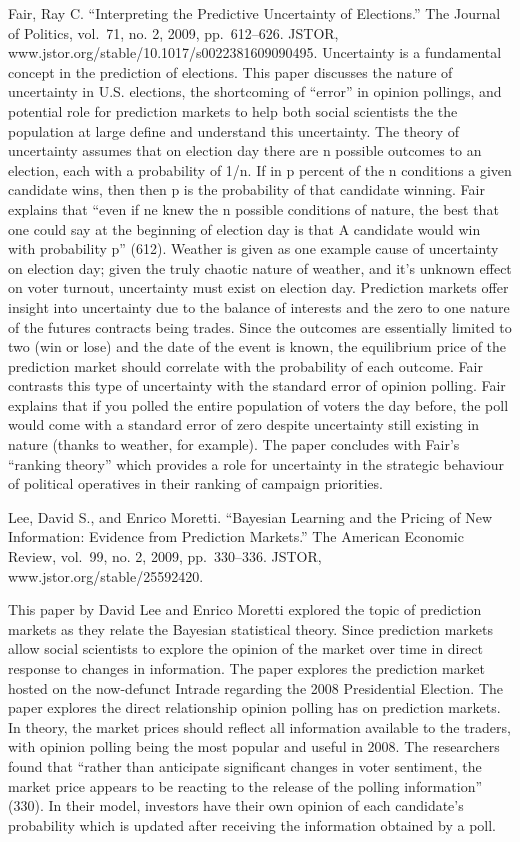 \documentclass[]{article}
\begin{document}
Fair, Ray C. ``Interpreting the Predictive Uncertainty of Elections.''
The Journal of Politics, vol.~71, no. 2, 2009, pp.~612--626. JSTOR,
www.jstor.org/stable/10.1017/s0022381609090495. Uncertainty is a
fundamental concept in the prediction of elections. This paper discusses
the nature of uncertainty in U.S. elections, the shortcoming of
``error'' in opinion pollings, and potential role for prediction markets
to help both social scientists the the population at large define and
understand this uncertainty. The theory of uncertainty assumes that on
election day there are n possible outcomes to an election, each with a
probability of 1/n. If in p percent of the n conditions a given
candidate wins, then then p is the probability of that candidate
winning. Fair explains that ``even if ne knew the n possible conditions
of nature, the best that one could say at the beginning of election day
is that A candidate would win with probability p'' (612). Weather is
given as one example cause of uncertainty on election day; given the
truly chaotic nature of weather, and it's unknown effect on voter
turnout, uncertainty must exist on election day. Prediction markets
offer insight into uncertainty due to the balance of interests and the
zero to one nature of the futures contracts being trades. Since the
outcomes are essentially limited to two (win or lose) and the date of
the event is known, the equilibrium price of the prediction market
should correlate with the probability of each outcome. Fair contrasts
this type of uncertainty with the standard error of opinion polling.
Fair explains that if you polled the entire population of voters the day
before, the poll would come with a standard error of zero despite
uncertainty still existing in nature (thanks to weather, for example).
The paper concludes with Fair's ``ranking theory'' which provides a role
for uncertainty in the strategic behaviour of political operatives in
their ranking of campaign priorities.

Lee, David S., and Enrico Moretti. ``Bayesian Learning and the Pricing
of New Information: Evidence from Prediction Markets.'' The American
Economic Review, vol.~99, no. 2, 2009, pp.~330--336. JSTOR,
www.jstor.org/stable/25592420.

This paper by David Lee and Enrico Moretti explored the topic of
prediction markets as they relate the Bayesian statistical theory. Since
prediction markets allow social scientists to explore the opinion of the
market over time in direct response to changes in information. The paper
explores the prediction market hosted on the now-defunct Intrade
regarding the 2008 Presidential Election. The paper explores the direct
relationship opinion polling has on prediction markets. In theory, the
market prices should reflect all information available to the traders,
with opinion polling being the most popular and useful in 2008. The
researchers found that ``rather than anticipate significant changes in
voter sentiment, the market price appears to be reacting to the release
of the polling information'' (330). In their model, investors have their
own opinion of each candidate's probability which is updated after
receiving the information obtained by a poll.
\end{document}
